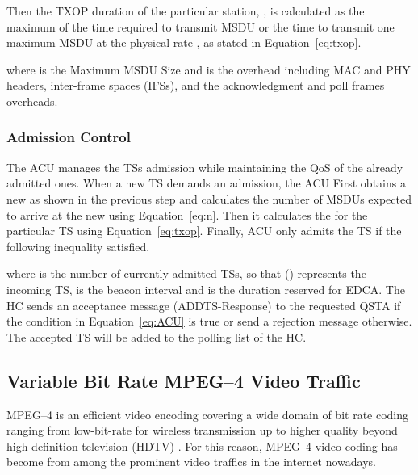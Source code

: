 \documentclass[a4paper, conference]{IEEEtran}
\begin{document}
Then the TXOP duration of the particular station, , is calculated as the maximum of the time required to transmit  MSDU or the time to transmit one maximum MSDU at the physical rate , as stated in Equation~\eqref{eq:txop}.

where  is the Maximum MSDU Size and  is the overhead including MAC and PHY headers, inter-frame spaces (IFSs), and the acknowledgment and poll frames overheads.
\subsubsection{Admission Control}
The ACU manages the TSs admission while maintaining the QoS of the already admitted ones. When a new TS demands an admission, the ACU First obtains a new  as shown in the previous step and calculates the number of MSDUs expected to arrive at the new  using Equation~\eqref{eq:n}. Then it calculates the  for the particular TS using Equation~\eqref{eq:txop}. Finally, ACU only admits the TS if the following inequality satisfied.

where  is the number of currently admitted TSs, so that () represents the incoming TS,  is the beacon interval and  is the duration reserved for EDCA. The HC sends an acceptance message (ADDTS-Response) to the requested QSTA if the condition in Equation~\eqref{eq:ACU} is true or send a rejection message otherwise. The accepted TS will be added to the polling list of the HC.
\subsection{Variable Bit Rate MPEG--4 Video Traffic}
\label{sec:VBRTraffic}
MPEG--4 is an efficient video encoding covering a wide domain of bit rate coding ranging from low-bit-rate for wireless transmission up to higher quality beyond high-definition television (HDTV) \cite{Fitzek2001}. For this reason, MPEG--4 video coding has become from among the prominent video traffics in the internet nowadays. 
\end{document}
